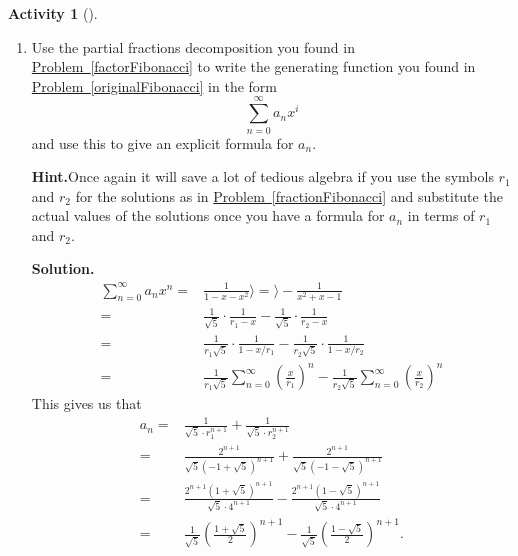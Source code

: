 \documentclass[10pt,]{book}
\theoremstyle{plain}
\theoremstyle{definition}
\newtheorem{activity}[project]{Activity}
\numberwithin{equation}{chapter}
\newcommand{\amp}{&}
\begin{document}
\begin{activity}[]\label{activity-194}
~\par
\begin{enumerate}[label=(\alph*)]
 \item Use the partial fractions decomposition you found in \hyperref[factorFibonacci]{Problem~\ref{factorFibonacci}} to write the generating function you found in \hyperref[originalFibonacci]{Problem~\ref{originalFibonacci}} in the form%
\begin{equation*}
\sum_{n=0}^\infty a_nx^i
\end{equation*}
and use this to give an explicit formula for \(a_n\).%
\par\medskip\noindent%
\textbf{Hint.}\quad Once again it will save a lot of tedious algebra if you use the symbols \(r_1\) and \(r_2\) for the solutions as in \hyperref[fractionFibonacci]{Problem~\ref{fractionFibonacci}} and substitute the actual values of the solutions once you have a formula for \(a_n\) in terms of \(r_1\) and \(r_2\).%
\par\medskip\noindent%
\textbf{Solution.}\quad %
\begin{align*}
\sum_{n=0}^\infty a_nx^n  =\amp \frac{1}{1-x-x^2}\rangle =\rangle -\frac{1}{x^2+x-1}\\
=\amp \frac{1}{\sqrt{5}}\cdot\frac{1}{r_1-x} -\frac{1}{\sqrt{5}}\cdot\frac{1}{r_2-x}\\
=\amp \frac{1}{r_1\sqrt{5}}\cdot\frac{1}{1-x/r_1} -\frac{1}{r_2\sqrt{5}}\cdot\frac{1}{1-x/r_2}\\
=\amp \frac{1}{r_1\sqrt{5}}\sum_{n=0}^\infty\left(\frac{x}{r_1}\right)^n
-\frac{1}{r_2\sqrt{5}}\sum_{n=0}^\infty  \left(\frac{x}{r_2}\right)^n
\end{align*}
This gives us that%
\begin{align*}
a_n =\amp \frac{1}{\sqrt{5}\cdot r_1^{n+1}}
+\frac{1}{\sqrt{5}\cdot r_2^{n+1}}\\
=\amp \frac{2^{n+1}}{\sqrt{5}(-1+\sqrt{5})^{n+1}}
+
\frac{2^{n+1}}{\sqrt{5}(-1-\sqrt{5})^{n+1}}\\
=\amp \frac{2^{n+1}(1+\sqrt{5})^{n+1}}{\sqrt{5}\cdot
4^{n+1}}-
\frac{2^{n+1}(1-\sqrt{5})^{n+1}}{\sqrt{5}\cdot4^{n+1}}\\
=\amp \frac{1}{\sqrt{5}}\left(\frac{1+\sqrt{5}}{2}\right)^{n+1}-
\frac{1}{\sqrt{5}}\left(\frac{1-\sqrt{5}}{2}\right)^{n+1}.
\end{align*}
%


\end{enumerate}
\end{activity}
\end{document}
